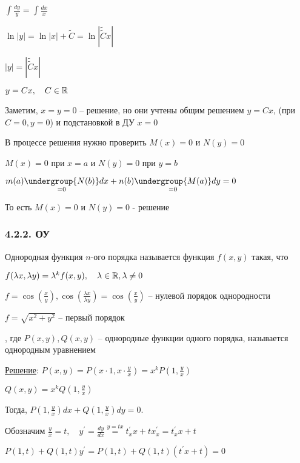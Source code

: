 \documentclass[12pt]{article}
\begin{document}
    $\int \frac{dy}{y} = \int \frac{dx}{x}$

    $\ln|y| = \ln|x| + \tilde{C} = \ln|\tilde{\tilde{C}}x|$

    $|y| = |\tilde{\tilde{C}}x|$

    $y = Cx, \quad C \in \mathbb{R}$

    Заметим, $x = y = 0$ -- решение, но они учтены общим решением $y = Cx$, (при $C = 0, y = 0$) и подстановкой в ДУ $x = 0$

    \Nota В процессе решения нужно проверить $M(x) = 0$ и $N(y) = 0$

    $M(x) = 0$ при $x = a$ и $N(y) = 0$ при $y = b$

    $m(a)\underset{=0}{\undergroup{N(b)}}dx + n(b)\underset{=0}{\undergroup{M(a)}}dy = 0$

    То есть $M(x) = 0$ и $N(y) = 0$ - решение

    \hypertarget{homogeneousequation}{}

    \subsubsection{4.2.2. ОУ}

     Однородная функция $n$-ого порядка называется функция $f(x, y)$ такая, что

    $f(\lambda x, \lambda y) = \lambda^k f(x, y), \quad \lambda \in \mathbb{R}, \lambda \neq 0$

    \Exs $f = \cos\left(\frac{x}{y}\right), \cos\left(\frac{\lambda x}{\lambda y}\right) = \cos\left(\frac{x}{y}\right)$ -- нулевой порядок однородности

    $f = \sqrt{x^2 + y^2}$ -- первый порядок

     , где $P(x, y), Q(x, y)$ -- однородные функции одного порядка, называется однородным уравнением

    \underline{Решение}: $P(x, y) = P\left(x \cdot 1, x \cdot \frac{y}{x}\right) = x^k P\left(1, \frac{y}{x}\right)$

    $Q(x, y) = x^k Q\left(1, \frac{y}{x}\right)$

    Тогда, $P\left(1, \frac{y}{x}\right)dx + Q\left(1, \frac{y}{x}\right)dy = 0$.

    Обозначим $\frac{y}{x} = t, \quad y^\prime = \frac{dy}{dx} \stackrel{y = tx}{=} t^\prime_x x + t x^\prime_x = t^\prime_x x + t$

    $P(1, t) + Q(1, t)y^\prime = P(1, t) + Q(1, t)(t^\prime x + t) = 0$
\end{document}
